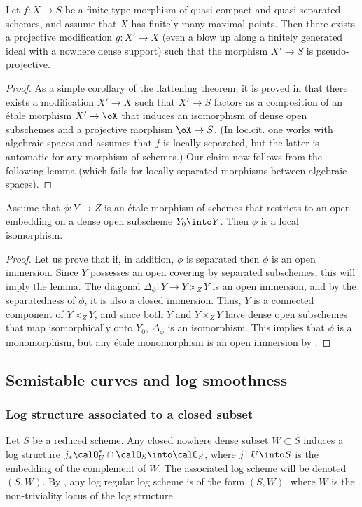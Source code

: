 \documentclass[10pt]{../fichiers-configuration-latex/smfart}
\begin{document}
\begin{proposition2}\label{10-chowlem}
Let $f{\colon}X\to S$ be a finite type morphism of quasi-compact and quasi-separated schemes,
and assume that $X$ has finitely many maximal points. Then there exists a projective
modification $g{\colon}X'\to X$ (even a blow up along a finitely generated ideal with
a nowhere dense support) such that the morphism $X'\to S$ is pseudo-projective.
\end{proposition2}
\begin{proof}
As a simple corollary of the flattening theorem, it is proved in \cite[5.7.13]{Platification@Raynaud-Gruson}
that there exists a modification $X'\to X$ such that $X'\to S$ factors as a composition of an
étale morphism $X'\to\oX$ that induces an isomorphism of dense open subschemes and a projective
morphism $\oX\to S$. (In loc.cit. one works with algebraic spaces and assumes that $f$ is locally
separated, but the latter is automatic for any morphism of schemes.) Our claim now follows from
the following lemma (which fails for locally separated morphisms between algebraic spaces).
\end{proof}

\begin{lemma2}
Assume that $\phi{\colon}Y\to Z$ is an étale morphism of schemes that restricts to an open
embedding on a dense open subscheme $Y_0\into Y$. Then $\phi$ is a local isomorphism.
\end{lemma2}
\begin{proof}
Let us prove that if, in addition, $\phi$ is separated then $\phi$ is an open immersion.
Since $Y$ possesses an open covering by separated subschemes, this will imply the lemma.
The diagonal $\Delta_\phi{\colon}Y\to Y\times_ZY$ is an open immersion, and by the
separatedness of $\phi$, it is also a closed immersion. Thus, $Y$ is a connected
component of $Y\times_ZY$, and since both $Y$ and $Y\times_ZY$ have dense open
subschemes that map isomorphically onto $Y_0$, $\Delta_\phi$ is an isomorphism.
This implies that $\phi$ is a monomorphism, but any étale monomorphism is an
open immersion by \cite[17.9.1]{EGAIV-4}.
\end{proof}

\subsection{Semistable curves and log smoothness}

\subsubsection{Log structure associated to a closed subset}
Let $S$ be a reduced scheme. Any closed nowhere dense subset $W\subset S$ induces
a log structure $j_*\calO^*_U\cap\calO_S\into\calO_S$, where $j{\colon}U\into S$
is the embedding of the complement of $W$. The associated log scheme will be denoted
$(S,W)$. By , any log regular log scheme is of the form $(S,W)$,
where $W$ is the non-triviality locus of the log structure.
\end{document}
